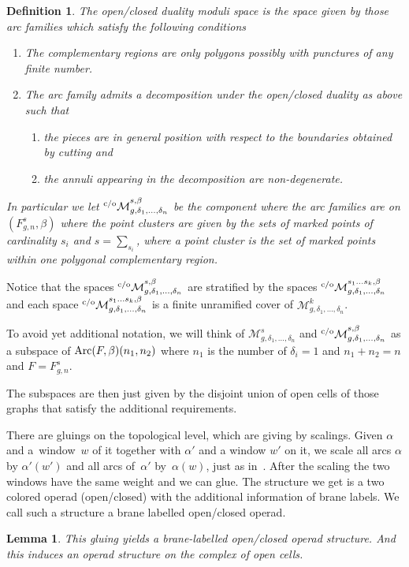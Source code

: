 \documentclass[pdftex]{sigma}
\newtheorem{lem}[thm]{Lemma}
\newtheorem{df}[thm]{Definition}
\def\M{{\mathcal M}}
\def\Mco{{{}^{\rm c/o}\mathcal M}_{g,\delta_1,\dots,\delta_n}^{s,\beta}}
\def\Mcos{{{}^{\rm c/o}\mathcal M}_{g,\delta_1,\dots,\delta_n}^{s_1\dots s_k,\beta}}
\def\a{\alpha}
\begin{document}
\begin{df}
The open/closed duality moduli space is the space
given by those arc families which satisfy the following conditions
\begin{enumerate}\itemsep=0pt
\item The complementary regions are  only polygons possibly with punctures of any f\/inite number. \item The arc family admits a
  decomposition under the open/closed duality as above such that
  \begin{enumerate}\itemsep=0pt
  \item the pieces are in general position with respect to the boundaries obtained by cutting and
  \item  the annuli appearing in the decomposition are non-degenerate.
\end{enumerate}
\end{enumerate}

In particular we let  $\Mco$ be the component where the arc families are on $(F_{g,n}^{s},\beta)$
where the point clusters are given by the sets of marked points of cardinality $s_i$ and $s=\sum_{s_i}$, where a point
cluster is the set of marked points within one polygonal complementary region.
\end{df}

Notice that the spaces $\Mco$ are stratif\/ied by the spaces $\Mcos$ and each space
 $\Mcos$ is a f\/inite unramif\/ied cover of $\M_{g,\delta_1,\dots,\delta_n}^k$.

To avoid yet additional notation, we will think of $\M_{g,\delta_1,\dots,\delta_n}^s$ and $\Mco$ as a subspace of ${\rm Arc}(F,\beta)(n_1,n_2)$ where $n_1$ is the number of $\delta_i=1$ and $n_1+n_2=n$ and $F=F_{g,n}^s$.

The subspaces are then just given by the disjoint union of open cells of those graphs that
satisfy the additional requirements.

There are gluings on the topological level, which are giving by scalings. Given $\a$ and a~window~$w$ of it together with $\a'$ and a window $w'$ on it, we scale all arcs $\a$ by $\a'(w')$ and all arcs of~$\a'$ by~$\a(w)$, just as in~\cite{KLP}.  After the scaling the two windows have the same weight and
we can glue. The structure we get is a two colored operad (open/closed) with the additional
information of brane labels. We call such a structure a brane labelled open/closed operad.

\begin{lem}
This gluing yields a brane-labelled open/closed operad structure. And this induces
an operad structure on the complex of open cells.
\end{lem}
\end{document}
